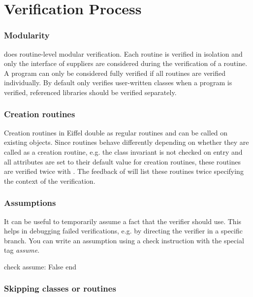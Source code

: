 \section{Verification Process}


\subsubsection{Modularity}

  \AutoProof does routine-level modular verification. Each routine is verified in isolation and only the interface of suppliers are considered during the verification of a routine. A program can only be considered fully verified if all routines are verified individually. By default \AutoProof only verifies user-written classes when a program is verified, referenced libraries should be verified separately.

\subsubsection{Creation routines}

  Creation routines in Eiffel double as regular routines and can be called on existing objects. Since routines behave differently depending on whether they are called as a creation routine, e.g. the class invariant is not checked on entry and all attributes are set to their default value for creation routines, these routines are verified twice with \AutoProof. The feedback of \AutoProof will list these routines twice specifying the context of the verification.

  
\subsubsection{Assumptions}

  It can be useful to temporarily assume a fact that the verifier should use. This helps in debugging failed verifications, e.g. by directing the verifier in a specific branch. You can write an assumption using a check instruction with the special tag \emph{assume}.

\begin{erunning}
check assume: False end
\end{erunning}

\subsubsection{Skipping classes or routines}

